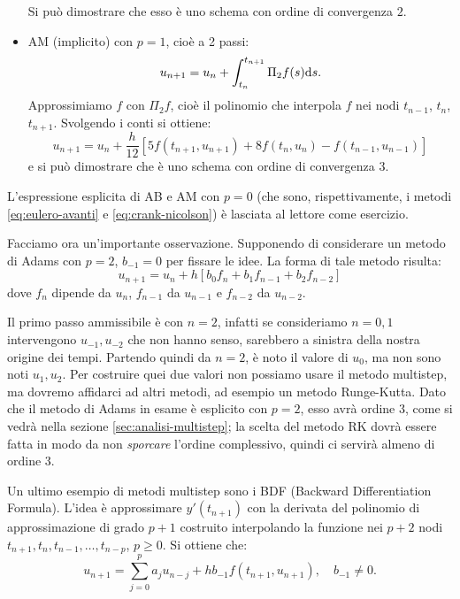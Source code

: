 \begin{itemize}
\begin{equation*}
\end{equation*}
Si può dimostrare che esso è uno schema con ordine di convergenza $2$.
\item AM (implicito) con $p=1$, cioè a 2 passi:
\begin{equation*}
u_{n+1} =u_{n} +\int\nolimits ^{t_{n+1}}_{t_{n}} \Pi _{2} f(s) \mathrm d s.
\end{equation*}
Approssimiamo $f$ con $\Pi _{2} f$, cioè il polinomio che interpola $f$ nei nodi $t_{n-1}$, $t_{n}$, $t_{n+1}$. Svolgendo i conti si ottiene:
\begin{equation*}
u_{n+1} =u_{n} +\frac{h}{12}[ 5f( t_{n+1} ,u_{n+1}) +8f( t_{n} ,u_{n}) -f( t_{n-1} ,u_{n-1})]
\end{equation*}
e si può dimostrare che è uno schema con ordine di convergenza $3$.
\end{itemize}

L'espressione esplicita di AB e AM con $p=0$ (che sono, rispettivamente, i metodi \eqref{eq:eulero-avanti} e \eqref{eq:crank-nicolson}) è lasciata al lettore come esercizio.

Facciamo ora un'importante osservazione. Supponendo di considerare un metodo di Adams con $p=2$, $b_{-1}=0$ per fissare le idee. La forma di tale metodo risulta:
\begin{equation*}
	u_{n+1} = u_{n} + h[b_{0}f_{n}+b_{1}f_{n-1}+b_{2}f_{n-2}] 
\end{equation*}
dove $f_{n}$ dipende da $u_{n}$, $f_{n-1}$ da $u_{n-1}$ e $f_{n-2}$ da $u_{n-2}$.

Il primo passo ammissibile è con $n=2$, infatti se consideriamo $n=0,1$ intervengono $u_{-1},u_{-2}$ che non hanno senso, sarebbero a sinistra della nostra origine dei tempi.
Partendo quindi da $n=2$, è noto il valore di $u_{0}$, ma non sono noti $u_{1},u_{2}$.
Per costruire quei due valori non possiamo usare il metodo multistep, ma dovremo affidarci ad altri metodi, ad esempio un metodo Runge-Kutta.
Dato che il metodo di Adams in esame è esplicito con $p=2$, esso avrà ordine $3$, come si vedrà nella sezione \ref{sec:analisi-multistep}; la scelta del metodo RK dovrà essere fatta in modo da non \textit{sporcare} l'ordine complessivo, quindi ci servirà almeno di ordine $3$.

Un ultimo esempio di metodi multistep sono i BDF (Backward Differentiation Formula).
L'idea è approssimare $y'( t_{n+1})$ con la derivata del polinomio di approssimazione di grado $p+1$ costruito interpolando la funzione nei $p+2$ nodi $t_{n+1} ,t_{n} ,t_{n-1} ,\dotsc ,t_{n-p}$, $p\geqslant 0$.
Si ottiene che:
\begin{equation*}
u_{n+1} =\sum\limits ^{p}_{j=0} a_{j} u_{n-j} +hb_{-1} f( t_{n+1} ,u_{n+1}) ,\quad b_{-1} \neq 0.
\end{equation*}

